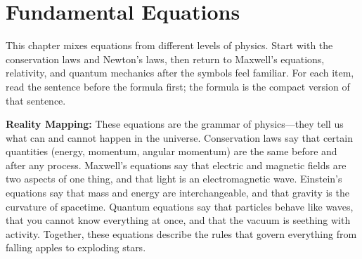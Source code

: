 \documentclass[11pt,openright]{book}
\begin{document}

\chapter{Fundamental Equations}

This chapter mixes equations from different levels of physics. Start with the conservation laws and Newton's laws, then return to Maxwell's equations, relativity, and quantum mechanics after the symbols feel familiar. For each item, read the sentence before the formula first; the formula is the compact version of that sentence.

\textbf{Reality Mapping:} These equations are the grammar of physics---they tell us what can and cannot happen in the universe. Conservation laws say that certain quantities (energy, momentum, angular momentum) are the same before and after any process. Maxwell's equations say that electric and magnetic fields are two aspects of one thing, and that light is an electromagnetic wave. Einstein's equations say that mass and energy are interchangeable, and that gravity is the curvature of spacetime. Quantum equations say that particles behave like waves, that you cannot know everything at once, and that the vacuum is seething with activity. Together, these equations describe the rules that govern everything from falling apples to exploding stars.
\end{document}
